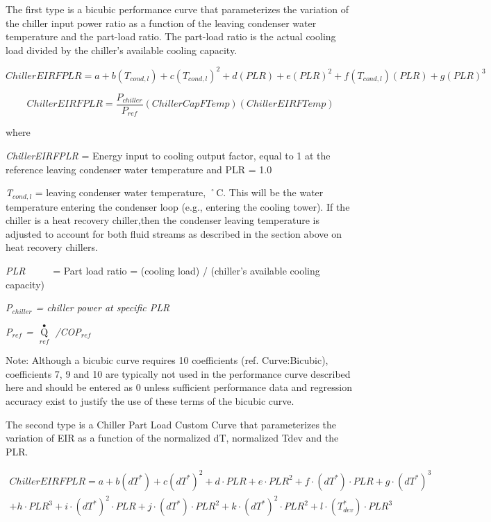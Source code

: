 The first type is a bicubic performance curve that parameterizes the variation of the chiller input power ratio as a function of the leaving condenser water temperature and the part-load ratio. The part-load ratio is the actual cooling load divided by the chiller's available cooling capacity.

\begin{equation}
ChillerEIRFPLR = a + b({T_{cond,l}}) + c{({T_{cond,l}})^2} + d(PLR) + e{(PLR)^2} + f({T_{cond,l}})(PLR) + g{(PLR)^3}
\end{equation}

\begin{equation}
  ChillerEIRFPLR = \frac{P_{chiller}}{P_{ref}}\left( {ChillerCapFTemp} \right)\left( {ChillerEIRFTemp} \right)
\end{equation}

where

\emph{ChillerEIRFPLR} = Energy input to cooling output factor, equal to 1 at the reference leaving condenser water temperature and PLR = 1.0

\emph{T\(_{cond,l}\)} = leaving condenser water temperature, ˚C. This will be the water temperature entering the condenser loop (e.g., entering the cooling tower). If the chiller is a heat recovery chiller,then the condenser leaving temperature is adjusted to account for both fluid streams as described in the section above on heat recovery chillers.

\emph{PLR}~~~~~ = Part load ratio = (cooling load) / (chiller's available cooling capacity)

\emph{P\(_{chiller}\) = chiller power at specific PLR}

\emph{P\(_{ref}\) = \({\mathop Q\limits^ \bullet_{ref}}\) /COP\(_{ref}\)}

Note: Although a bicubic curve requires 10 coefficients (ref. Curve:Bicubic), coefficients 7, 9 and 10 are typically not used in the performance curve described here and should be entered as 0 unless sufficient performance data and regression accuracy exist to justify the use of these terms of the bicubic curve.

The second type is a Chiller Part Load Custom Curve that parameterizes the variation of EIR as a function of the normalized dT, normalized Tdev and the PLR.

\begin{equation}
\begin{split}
ChillerEIRFPLR = a + b(dT^*) + c(dT^*)^2 + d \cdot PLR + e \cdot PLR^2 + f \cdot (dT^*) \cdot PLR + g \cdot (dT^*)^3 \\
+ h \cdot PLR^3 + i \cdot (dT^*)^2 \cdot PLR + j \cdot (dT^*) \cdot PLR^2 + k \cdot (dT^*)^2 \cdot PLR^2 + l \cdot (T_{dev}^*) \cdot PLR^3
\end{split}
\end{equation}

